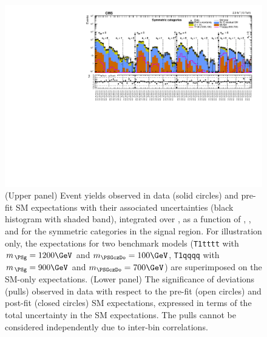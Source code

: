 \begin{figure}[!htb]
  \centering
    \includegraphics[width=\cmsFigWidthTwo]{Figure_005.pdf}
    \caption{(Upper panel) Event yields observed in data (solid
      circles) and pre-fit SM expectations with their associated
      uncertainties (black histogram with shaded band), integrated
      over \HTmiss, as a function of \njet, \nb, and \scalht for the
      symmetric \njet categories in the signal region. For
      illustration only, the expectations for two benchmark models
      (\texttt{T1tttt} with $m_{\,\PSg} = 1200\GeV$ and $m_{\PSGczDo}
      = 100\GeV$, \texttt{T1qqqq} with $m_{\,\PSg} = 900\GeV$ and
      $m_{\PSGczDo} = 700\GeV$) are superimposed on the SM-only
      expectations. (Lower panel) The significance of deviations
      (pulls) observed in data with respect to the pre-fit (open
      circles) and post-fit (closed circles) SM expectations,
      expressed in terms of the total uncertainty in the SM
      expectations. The pulls cannot be considered independently due
      to inter-bin correlations.}
    \label{fig:sym}
\end{figure}


